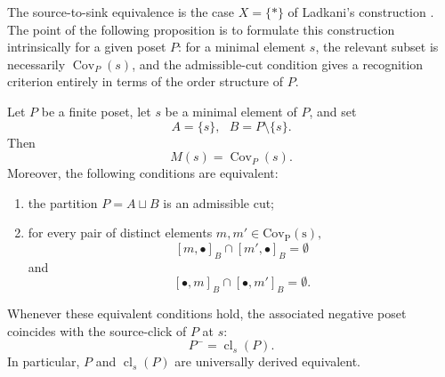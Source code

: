 The source-to-sink equivalence is the case $X=\{*\}$ of Ladkani's construction \cite[Corollary 1.7]{ladkani}. The point of the following proposition is to formulate this construction intrinsically for a given poset $P$: for a minimal element $s$, the relevant subset is necessarily $\operatorname{Cov}_P(s)$, and the admissible-cut condition gives a recognition criterion entirely in terms of the order structure of $P$.

\begin{proposition}%
\label{General source-click criterion}
Let $P$ be a finite poset, let $s$ be a minimal element of $P$, and set
\[A=\{s\}, \,\,\,\, B=P \setminus\{s\}.\] Then \[M(s)=\operatorname{Cov}_P(s).\]
Moreover, the following conditions are equivalent:
\begin{enumerate}
    \item the partition $P=A \sqcup B$ is an admissible cut;
    \item for every pair of distinct elements $m,m' \in \operatorname{Cov_P(s)},$
    \[[m,\bullet]_B \cap [m', \bullet]_B= \emptyset\] and \[[\bullet, m]_B \cap [\bullet, m']_B = \emptyset.\]
\end{enumerate}
    Whenever these equivalent conditions hold, the associated negative poset coincides with the source-click of $P$ at $s$:
    \[P^-=\operatorname{cl}_s(P).\]
    In particular, $P$ and $\operatorname{cl}_s(P)$ are universally derived equivalent.
    
\end{proposition}

